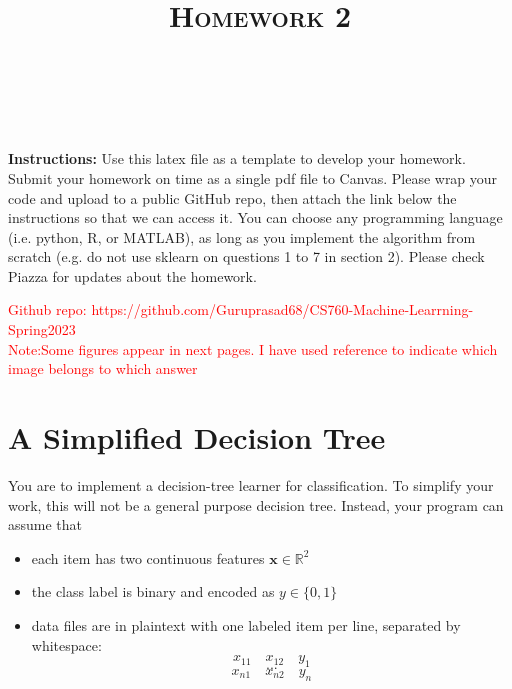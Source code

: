 \documentclass[a4paper]{article}
\title{\textsc{Homework 2}} %
\author{
\red{$>>$Guruprasad Viswanathan Ramesh$<<$} \\
\red{$>>$9082378762$<<$}\\
}
\date{}
\theoremstyle{definition}
\newcommand{\RR}{\mathbb{R}}
\newcommand{\red}[1]{\textcolor{red}{#1}}
\def\x{\mathbf x}
\begin{document}
\maketitle 


\textbf{Instructions:} 
Use this latex file as a template to develop your homework. Submit your homework on time as a single pdf file to Canvas. Please wrap your code and upload to a public GitHub repo, then attach the link below the instructions so that we can access it. You can choose any programming language (i.e. python, R, or MATLAB), as long as you implement the algorithm from scratch (e.g. do not use sklearn on questions 1 to 7 in section 2). Please check Piazza for updates about the homework.

\red{Github repo: https://github.com/Guruprasad68/CS760-Machine-Learrning-Spring2023}\\
\red{Note:Some figures appear in next pages. I have used reference to indicate which image belongs to which answer}
\section{A Simplified Decision Tree}
You are to implement a decision-tree learner for classification.
To simplify your work, this will not be a general purpose decision tree.  Instead, your program can assume that
\begin{itemize}
\item each item has two continuous features $\x \in \RR^2$
\item the class label is binary and encoded as $y \in \{0,1\}$
\item data files are in plaintext with one labeled item per line, separated by whitespace:
$$x_{11} \quad x_{12} \quad y_1$$
$$...$$
$$x_{n1} \quad x_{n2} \quad y_n$$
\end{itemize}
\end{document}
